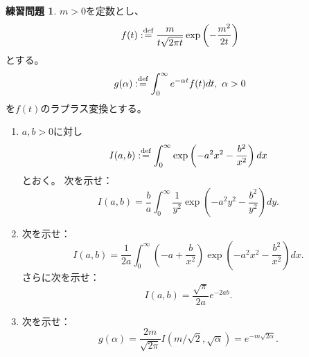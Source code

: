 \documentclass[uplatex]{jsarticle}
\theoremstyle{definition}
\newtheorem{prob}[prob]{練習問題}
\def\dfn{:\overset{\mbox{{\scriptsize def}}}{=}}
\begin{document}
\begin{prob}\label{prob: 3.9}
  \(m > 0\)を定数とし、
  \[
  f(t) \dfn \frac{m}{t\sqrt{2\pi t}}\exp \left( -\frac{m^2}{2t} \right)
  \]
  とする。
  \[
  g(\alpha) \dfn \int_0^\infty e^{-\alpha t}f(t)dt, \ \alpha > 0
  \]
  を\(f(t)\)のラプラス変換とする。
  \begin{enumerate}
    \item \label{enumi: 3.9-1}
    \(a,b > 0\)に対し
    \[
    I(a,b) \dfn \int_0^\infty \exp \left(
    -a^2x^2-\frac{b^2}{x^2}
    \right) dx
    \]
    とおく。
    次を示せ：
    \[
    I(a,b) = \frac{b}{a} \int_0^\infty \frac{1}{y^2}\exp \left(
    -a^2y^2-\frac{b^2}{y^2}
    \right) dy.
    \]
    \item \label{enumi: 3.9-2}
    次を示せ：
    \[
    I(a,b) = \frac{1}{2a} \int_0^\infty \left(
    -a+\frac{b}{x^2}\right) \exp \left(
    -a^2x^2-\frac{b^2}{x^2}
    \right) dx.
    \]
    さらに次を示せ：
    \[
    I(a,b) = \frac{\sqrt{\pi}}{2a}e^{-2ab}.
    \]
    \item \label{enumi: 3.9-3}
    次を示せ：
    \[
    g(\alpha) = \frac{2m}{\sqrt{2\pi}}I(m/\sqrt{2},\sqrt{\alpha})
    = e^{-m\sqrt{2\alpha}}.
    \]
  \end{enumerate}
\end{prob}
\end{document}
